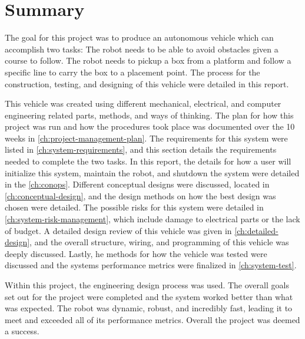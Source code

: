 \documentclass[11pt]{report}
\begin{document}
\chapter{Summary}\label{ch:summary}
The goal for this project was to produce an autonomous vehicle which can accomplish two tasks: The robot needs to be able to avoid obstacles given a course to follow. The robot needs to pickup a box from a platform and follow a specific line to carry the box to a placement point. The process for the construction, testing, and designing of this vehicle were detailed in this report. 
\par This vehicle was created using different mechanical, electrical, and computer engineering related parts, methods, and ways of thinking. The plan for how this project was run and how the procedures took place was documented over the 10 weeks in \cref{ch:project-management-plan}. The requirements for this system were listed in \cref{ch:system-requirements}, and this section details the requirements needed to complete the two tasks. In this report, the details for how a user will initialize this system, maintain the robot, and shutdown the system were detailed in the \cref{ch:conops}. Different conceptual designs were discussed, located in \cref{ch:conceptual-design}, and the design methods on how the best design was chosen were detailed. The possible risks for this system were detailed in \cref{ch:system-risk-management}, which include damage to electrical parts or the lack of budget. A detailed design review of this vehicle was given in \cref{ch:detailed-design}, and the overall structure, wiring, and programming of this vehicle was deeply discussed. Lastly, he methods for how the vehicle was tested were discussed and the systems performance metrics were finalized in \cref{ch:system-test}. 

\par Within this project, the engineering design process was used. The overall goals set out for the project were completed and the system worked better than what was expected. The robot was dynamic, robust, and incredibly fast, leading it to meet and exceeded all of its performance metrics. Overall the project was deemed a success. 
\end{document}
